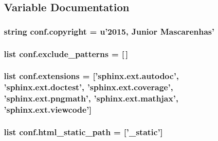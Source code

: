 \subsection{Variable Documentation}
\hypertarget{namespaceconf_a33fa97cf51dcb25970fbf53f10159589}{}
\subsubsection[{copyright}]{\setlength{\rightskip}{0pt plus 5cm}string conf.\+copyright = u'2015, Junior Mascarenhas'}\label{namespaceconf_a33fa97cf51dcb25970fbf53f10159589}
\hypertarget{namespaceconf_a7ad48fb6f3e9b129c02346ea0d3527c1}{}
\subsubsection[{exclude\+\_\+patterns}]{\setlength{\rightskip}{0pt plus 5cm}list conf.\+exclude\+\_\+patterns = \mbox{[}$\,$\mbox{]}}\label{namespaceconf_a7ad48fb6f3e9b129c02346ea0d3527c1}
\hypertarget{namespaceconf_ae475e080536acb271a0a0efe56c3ba42}{}
\subsubsection[{extensions}]{\setlength{\rightskip}{0pt plus 5cm}list conf.\+extensions = \mbox{[}'sphinx.\+ext.\+autodoc', 'sphinx.\+ext.\+doctest', 'sphinx.\+ext.\+coverage', 'sphinx.\+ext.\+pngmath', 'sphinx.\+ext.\+mathjax', 'sphinx.\+ext.\+viewcode'\mbox{]}}\label{namespaceconf_ae475e080536acb271a0a0efe56c3ba42}
\hypertarget{namespaceconf_af4fb5d8851ccaade135c2668dd3ced41}{}
\subsubsection[{html\+\_\+static\+\_\+path}]{\setlength{\rightskip}{0pt plus 5cm}list conf.\+html\+\_\+static\+\_\+path = \mbox{[}'\+\_\+static'\mbox{]}}\label{namespaceconf_af4fb5d8851ccaade135c2668dd3ced41}
\hypertarget{namespaceconf_a6c3bfcc1a44546c1c75ce20f55bd0fd6}{}
